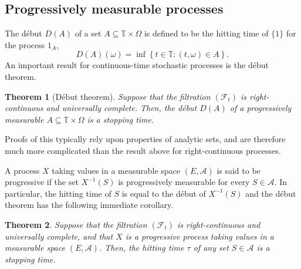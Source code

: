 \documentclass[12pt]{article}
\newtheorem*{theorem*}{Theorem}
\begin{document}
\subsection*{Progressively measurable processes}

The d\'ebut $D(A)$ of a set $A\subseteq\mathbb{T}\times\Omega$ is defined to be the hitting time of $\{1\}$ for the process $1_A$,
\begin{equation*}
D(A)(\omega)=\inf\left\{ t\in\mathbb{T}:(t,\omega)\in A\right\}.
\end{equation*}
An important result for continuous-time stochastic processes is the d\'ebut theorem.

\begin{theorem*}[D\'ebut theorem]
Suppose that the filtration $(\mathcal{F}_t)$ is right-continuous and universally complete. Then, the d\'ebut $D(A)$ of a progressively measurable $A\subseteq\mathbb{T}\times\Omega$ is a stopping time.
\end{theorem*}

Proofs of this typically rely upon properties of analytic sets, and are therefore much more complicated than the result above for right-continuous processes.

A process $X$ taking values in a measurable space $(E,\mathcal{A})$ is said to be progressive if the set $X^{-1}(S)$ is progressively measurable for every $S\in\mathcal{A}$. In particular, the hitting time of $S$ is equal to the d\'ebut of $X^{-1}(S)$ and the d\'ebut theorem has the following immediate corollary.

\begin{theorem*}
Suppose that the filtration $(\mathcal{F}_t)$ is right-continuous and universally complete, and that $X$ is a progressive process taking values in a measurable space $(E,\mathcal{A})$. Then, the hitting time $\tau$ of any set $S\in\mathcal{A}$ is a stopping time.
\end{theorem*}

\end{document}
